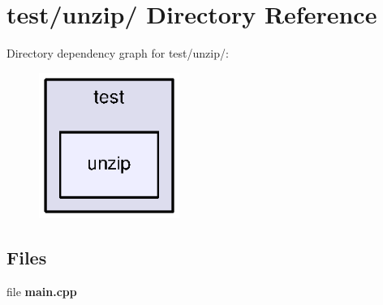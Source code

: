 \section{test/unzip/ Directory Reference}
\label{dir_1f142e4f9afd52e31bf161680885dacb}
Directory dependency graph for test/unzip/:
\nopagebreak
\begin{figure}[H]
\begin{center}
\leavevmode
\includegraphics[width=130pt]{dir_1f142e4f9afd52e31bf161680885dacb_dep}
\end{center}
\end{figure}
\subsection*{Files}
\begin{DoxyCompactItemize}
\item 
file {\bfseries main.cpp}
\end{DoxyCompactItemize}
